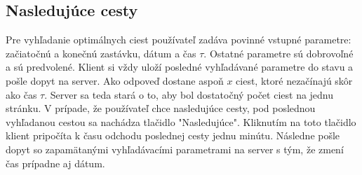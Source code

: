 \subsection{Nasledujúce cesty}
Pre vyhľadanie optimálnych ciest používateľ zadáva povinné vstupné parametre: začiatočnú a konečnú zastávku, dátum a čas $\tau$. Ostatné parametre sú dobrovoľné a sú predvolené. Klient si vždy uloží posledné vyhľadávané parametre do stavu a pošle dopyt na server. Ako odpoveď  dostane aspoň $x$ ciest, ktoré nezačínajú skôr ako čas $\tau$. Server sa teda stará o to, aby bol dostatočný počet ciest na jednu stránku. V prípade, že používateľ chce nasledujúce cesty, pod poslednou vyhľadanou cestou sa nachádza tlačidlo "Nasledujúce". Kliknutím na toto tlačidlo klient pripočíta k času odchodu poslednej cesty jednu minútu. Následne pošle dopyt so zapamätanými vyhľadávacími parametrami na server s tým, že zmení čas prípadne aj dátum. 




























